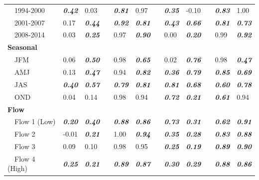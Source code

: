 \documentclass[letterpaper,12pt,oneside]{article}\usepackage[]{graphicx}\usepackage[]{color}
\begin{document}
\begin{table}[!tbp]
\begin{center}
\begin{tabular}{lllcllcllcll}
~~1994-2000&{\bf \textit{0.42}}&0.03&&{\bf \textit{0.81}}&0.97&&{\bf \textit{0.35}}&-0.10&&{\bf \textit{0.83}}&1.00\tabularnewline
~~2001-2007&0.17&{\bf \textit{0.44}}&&{\bf \textit{0.92}}&{\bf \textit{0.81}}&&{\bf \textit{0.43}}&{\bf \textit{0.66}}&&{\bf \textit{0.81}}&{\bf \textit{0.73}}\tabularnewline
~~2008-2014&0.03&{\bf \textit{0.25}}&&0.97&{\bf \textit{0.90}}&&0.00&{\bf \textit{0.20}}&&0.99&{\bf \textit{0.92}}\tabularnewline
\hline
{\bfseries Seasonal}&&&&&&&&&&&\tabularnewline
~~JFM&0.06&{\bf \textit{0.50}}&&0.98&{\bf \textit{0.65}}&&0.02&{\bf \textit{0.76}}&&0.98&{\bf \textit{0.47}}\tabularnewline
~~AMJ&0.13&{\bf \textit{0.47}}&&0.94&{\bf \textit{0.82}}&&{\bf \textit{0.36}}&{\bf \textit{0.79}}&&{\bf \textit{0.85}}&{\bf \textit{0.69}}\tabularnewline
~~JAS&{\bf \textit{0.40}}&{\bf \textit{0.57}}&&{\bf \textit{0.79}}&{\bf \textit{0.81}}&&{\bf \textit{0.81}}&{\bf \textit{0.68}}&&{\bf \textit{0.60}}&{\bf \textit{0.78}}\tabularnewline
~~OND&0.04&0.14&&0.98&0.94&&{\bf \textit{0.72}}&{\bf \textit{0.21}}&&{\bf \textit{0.61}}&0.94\tabularnewline
\hline
{\bfseries Flow}&&&&&&&&&&&\tabularnewline
~~Flow 1 (Low)&{\bf \textit{0.20}}&{\bf \textit{0.40}}&&{\bf \textit{0.88}}&{\bf \textit{0.86}}&&{\bf \textit{0.73}}&{\bf \textit{0.31}}&&{\bf \textit{0.62}}&{\bf \textit{0.91}}\tabularnewline
~~Flow 2&-0.01&{\bf \textit{0.21}}&&1.00&{\bf \textit{0.94}}&&{\bf \textit{0.35}}&{\bf \textit{0.28}}&&{\bf \textit{0.83}}&{\bf \textit{0.88}}\tabularnewline
~~Flow 3&0.09&0.10&&0.98&0.95&&{\bf \textit{0.25}}&{\bf \textit{0.19}}&&{\bf \textit{0.89}}&{\bf \textit{0.90}}\tabularnewline
~~Flow 4 (High)&{\bf \textit{0.25}}&{\bf \textit{0.21}}&&{\bf \textit{0.89}}&{\bf \textit{0.87}}&&{\bf \textit{0.30}}&{\bf \textit{0.29}}&&{\bf \textit{0.88}}&{\bf \textit{0.86}}\tabularnewline
\hline
\end{tabular}\end{center}

\end{table}




\end{document}
